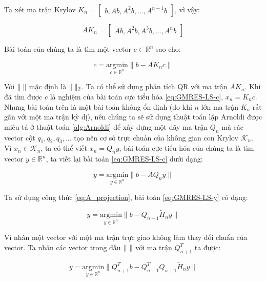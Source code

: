 \documentclass[14pt, a4paper]{article}
\numberwithin{equation}{section}
\numberwithin{algorithm}{section}
\numberwithin{figure}{section}
\numberwithin{dl}{section}
\numberwithin{md}{section}
\numberwithin{bd}{section}
\numberwithin{dn}{section}
\numberwithin{hq}{section}
\begin{document}
Ta xét ma trận Krylov $K_n = \begin{bmatrix} b, Ab, A^2b, \dots, A^{n-1}b \end{bmatrix}$, vì vậy:

\begin{equation}
    A K_n = \begin{bmatrix} Ab, A^2b, A^3b, \dots, A^nb \end{bmatrix}
\end{equation}

Bài toán của chúng ta là tìm một vector $c \in \mathbb{R}^n$ sao cho:

\begin{equation} \label{eq:GMRES-LS-c}
    c = \underset{c \in \mathbb{R}^{n}}{\mathrm{argmin}} \lVert b - AK_n c \rVert
\end{equation}

Với $\lVert \thickspace \rVert$ mặc định là $\lVert \thickspace \rVert_2$. Ta có thể sử dụng phân tích QR với ma trận $AK_n$. Khi đã tìm được $c$ là nghiệm của bài toán cực tiểu hóa \ref{eq:GMRES-LS-c}, $x_n=K_n c$. Nhưng bài toán trên là một bài toán không ổn định (do khi $n$ lớn ma trận $K_n$ rất gần với một ma trận kỳ dị), nên chúng ta sẽ sử dụng thuật toán lặp Arnoldi được miêu tả ở thuật toán \ref{alg:Arnoldi}
để xây dựng một dãy ma trận $Q_n$ mà các vector cột $q_1, q_2, q_3, \dots$ tạo nên cơ sở trực chuản của không gian con Krylov $\mathcal{K}_n$. Vì $x_n \in \mathcal{K}_n$, ta có thể viết $x_n = Q_n y$, bài toán cực tiểu hóa của chúng ta là tìm vector $y \in \mathbb{R}^n$, ta viết lại bài toán \ref{eq:GMRES-LS-c} dưới dạng:

\begin{equation} \label{eq:GMRES-LS-y}
    y = \underset{y \in \mathbb{R}^{n}}{\mathrm{argmin}} \lVert b - A Q_n y \rVert
\end{equation}

Ta sử dụng công thức \ref{eq:A_projection}, bài toán \ref{eq:GMRES-LS-y} có dạng:

\begin{equation}
    y = \underset{y \in \mathbb{R}^{n}}{\mathrm{argmin}} \lVert b - Q_{n+1} \widetilde{H}_n y \rVert
\end{equation}

Vì nhân một vector với một ma trận trực giao không làm thay đổi chuẩn của vector. Ta nhân các vector trong dấu $\lVert \thickspace \rVert$ với ma trận $Q_{n+1}^T$ ta được:

\begin{equation}
    y = \underset{y \in \mathbb{R}^{n}}{\mathrm{argmin}} \lVert Q_{n+1}^T b - Q_{n+1}^T Q_{n+1} \widetilde{H}_n y \rVert
\end{equation}
\end{document}

